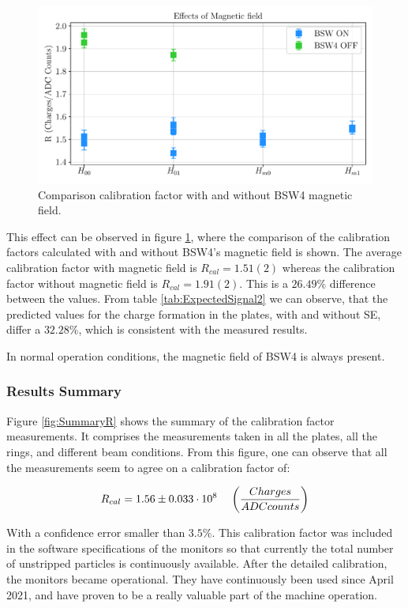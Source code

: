 \begin{figure}[h]
    \centering
    \includegraphics[width=0.75\columnwidth]{Figure_MagneticFieldCompa/MagnetEffect.pdf}
    \caption{Comparison calibration factor with and without BSW4 magnetic field.}
    \label{fig:MagneticFieldEffect}
\end{figure}

This effect can be observed in figure \ref{fig:MagneticFieldEffect}, where the comparison of the calibration factors calculated with and without BSW4's magnetic field is shown. The average calibration factor with magnetic field is $R_{cal} = 1.51(2)$ whereas the calibration factor without magnetic field is $R_{cal} = 1.91(2)$. This is a $26.49 \%$ difference between the values. From table \ref{tab:ExpectedSignal2} we can observe, that the predicted values for the charge formation in the plates, with and without SE, differ a $32.28 \%$, which is consistent with the measured results. 

In normal operation conditions, the magnetic field of BSW4 is always present. 

\subsubsection{Results Summary}

Figure \ref{fig:SummaryR} shows the summary of the calibration factor measurements. It comprises the measurements taken in all the plates, all the rings, and different beam conditions. From this figure, one can observe that all the measurements seem to agree on a calibration factor of: 

\begin{equation}
    R_{cal} = 1.56 \pm 0.033 \cdot 10^8 \hspace{0.4cm} \left(\frac{Charges}{ADC counts}\right)
\end{equation}

With a confidence error smaller than $3.5\%$. This calibration factor was included in the software specifications of the \hzhm monitors so that currently the total number of unstripped particles is continuously available. After the detailed calibration, the monitors became operational. They have continuously been used since April 2021, and have proven to be a really valuable part of the machine operation. 

